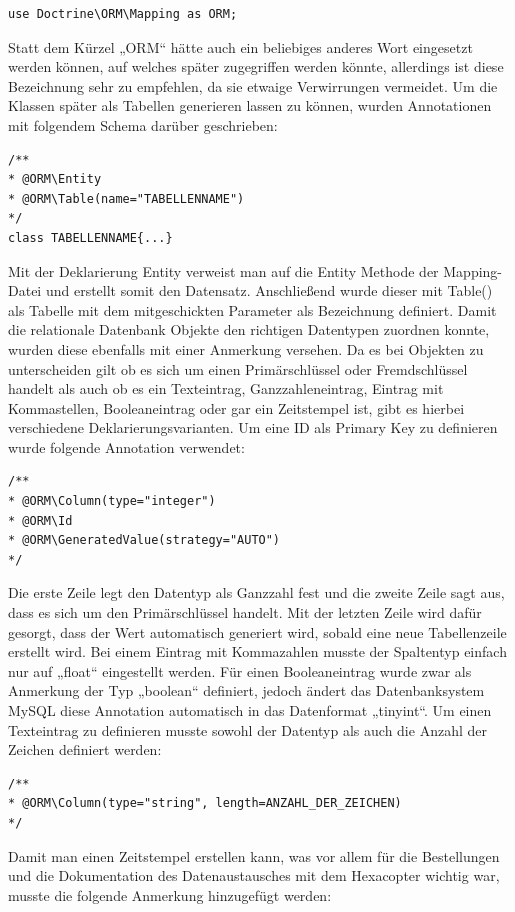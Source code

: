 	\lstset{language=php}
  	\begin{lstlisting}
use Doctrine\ORM\Mapping as ORM;
  	\end{lstlisting}
Statt dem Kürzel „ORM“ hätte auch ein beliebiges anderes Wort eingesetzt werden können, auf welches später zugegriffen werden könnte, allerdings ist diese Bezeichnung sehr zu empfehlen, da sie etwaige Verwirrungen vermeidet.
Um die Klassen später als Tabellen generieren lassen zu können, wurden Annotationen mit folgendem Schema darüber geschrieben:
	
	\lstset{language=php}
  	\begin{lstlisting}
/**
* @ORM\Entity
* @ORM\Table(name="TABELLENNAME")
*/
class TABELLENNAME{...}
  	\end{lstlisting}
Mit der Deklarierung Entity verweist man auf die Entity Methode der Mapping-Datei und erstellt somit den Datensatz. Anschließend wurde dieser mit Table() als Tabelle mit dem mitgeschickten Parameter als Bezeichnung definiert. 
Damit die relationale Datenbank Objekte den richtigen Datentypen zuordnen konnte, wurden diese ebenfalls mit einer Anmerkung versehen. Da es bei Objekten zu unterscheiden gilt ob es sich um einen Primärschlüssel oder Fremdschlüssel handelt als auch ob es ein Texteintrag, Ganzzahleneintrag, Eintrag mit Kommastellen, Booleaneintrag oder gar ein Zeitstempel ist, gibt es hierbei verschiedene Deklarierungsvarianten.
Um eine ID als Primary Key zu definieren wurde folgende Annotation verwendet:	
	\lstset{language=php}
  	\begin{lstlisting}
/**
* @ORM\Column(type="integer")
* @ORM\Id
* @ORM\GeneratedValue(strategy="AUTO")
*/
  	\end{lstlisting}
Die erste Zeile legt den Datentyp als Ganzzahl fest und die zweite Zeile sagt aus, dass es sich um den Primärschlüssel handelt. Mit der letzten Zeile wird dafür gesorgt, dass der Wert automatisch generiert wird, sobald eine neue Tabellenzeile erstellt wird.
Bei einem Eintrag mit Kommazahlen musste der Spaltentyp einfach nur auf „float“ eingestellt werden. Für einen Booleaneintrag wurde zwar als Anmerkung der Typ „boolean“ definiert, jedoch ändert das Datenbanksystem MySQL diese Annotation automatisch in das Datenformat „tinyint“.
Um einen Texteintrag zu definieren musste sowohl der Datentyp als auch die Anzahl der Zeichen definiert werden:
	
	\lstset{language=php}
  	\begin{lstlisting}
/**
* @ORM\Column(type="string", length=ANZAHL_DER_ZEICHEN)
*/
  	\end{lstlisting}
Damit man einen Zeitstempel erstellen kann, was vor allem für die Bestellungen und die Dokumentation des Datenaustausches mit dem Hexacopter wichtig war, musste die folgende Anmerkung hinzugefügt werden:
	
